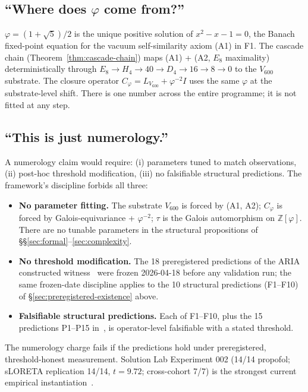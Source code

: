 \documentclass[11pt]{article}
\theoremstyle{plain}
\theoremstyle{definition}
\theoremstyle{remark}
\newcommand{\Zphi}{\mathbb{Z}[\varphi]}
\newcommand{\Cph}{C_\varphi}
\begin{document}
\subsection{``Where does $\varphi$ come from?''}

$\varphi = (1 + \sqrt 5)/2$ is the unique positive solution of $x^2 - x - 1 = 0$, the Banach fixed-point equation for the vacuum self-similarity axiom (A1) in \citet{SmartXXXVI} F1. The cascade chain (Theorem~\ref{thm:cascade-chain}) maps (A1) + (A2, $E_8$ maximality) deterministically through $E_8 \to H_4 \to 40 \to D_4 \to 16 \to 8 \to 0$ to the $V_{600}$ substrate. The closure operator $\Cph = L_{V_{600}} + \varphi^{-2} I$ uses the same $\varphi$ at the substrate-level shift. There is one number across the entire programme; it is not fitted at any step.

\subsection{``This is just numerology.''}

A numerology claim would require: (i) parameters tuned to match observations, (ii) post-hoc threshold modification, (iii) no falsifiable structural predictions. The framework's discipline forbids all three:

\begin{itemize}[leftmargin=2em]
\item \textbf{No parameter fitting.} The substrate $V_{600}$ is forced by (A1, A2); $\Cph$ is forced by Galois-equivariance + $\varphi^{-2}$; $\tau$ is the Galois automorphism on $\Zphi$. There are no tunable parameters in the structural propositions of \S\S\ref{sec:formal}--\ref{sec:complexity}.
\item \textbf{No threshold modification.} The 18 preregistered predictions of the ARIA constructed witness~\citep{SmartAriaChess2026} were frozen 2026-04-18 before any validation run; the same frozen-date discipline applies to the 10 structural predictions (F1--F10) of \S\ref{sec:preregistered-existence} above.
\item \textbf{Falsifiable structural predictions.} Each of F1--F10, plus the 15 predictions P1--P15 in~\citep{SmartLifeAsClosure}, is operator-level falsifiable with a stated threshold.
\end{itemize}

The numerology charge fails if the predictions hold under preregistered, threshold-honest measurement. Solution Lab Experiment 002 (14/14 propofol; sLORETA replication 14/14, $t = 9.72$; cross-cohort 7/7) is the strongest current empirical instantiation~\citep{SolutionLab002}.
\end{document}
